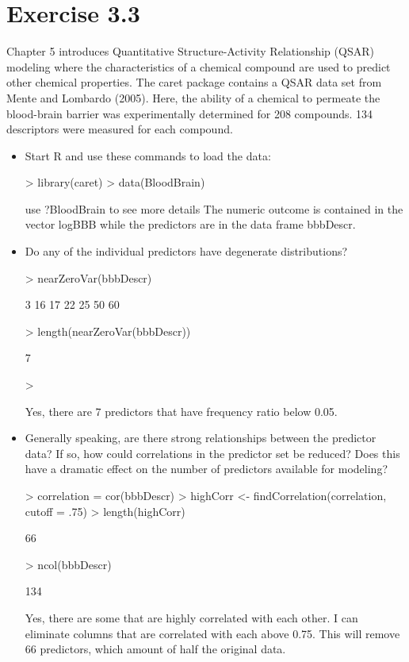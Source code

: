\documentclass[12pt]{article}
\begin{document}
\section{Exercise 3.3}
Chapter 5 introduces Quantitative Structure-Activity Relationship (QSAR) modeling where the characteristics of a chemical compound are used to predict other chemical properties. The caret package contains a QSAR data set from Mente and Lombardo (2005). Here, the ability of a chemical to permeate the blood-brain barrier was experimentally determined for 208 compounds. 134 descriptors were measured for each compound.
\begin{itemize}
\item
Start R and use these commands to load the data:
\begin{Schunk}
\begin{Sinput}
> library(caret)
> data(BloodBrain)
\end{Sinput}
\end{Schunk}
use ?BloodBrain to see more details
The numeric outcome is contained in the vector logBBB while the predictors
are in the data frame bbbDescr.
\item
Do any of the individual predictors have degenerate distributions?
\begin{Schunk}
\begin{Sinput}
> nearZeroVar(bbbDescr)
\end{Sinput}
\begin{Soutput}
[1]  3 16 17 22 25 50 60
\end{Soutput}
\begin{Sinput}
> length(nearZeroVar(bbbDescr))
\end{Sinput}
\begin{Soutput}
[1] 7
\end{Soutput}
\begin{Sinput}
> 
\end{Sinput}
\end{Schunk}
Yes, there are 7 predictors that have frequency ratio below 0.05.

\item
Generally speaking, are there strong relationships between the predictor
data? If so, how could correlations in the predictor set be reduced?
Does this have a dramatic effect on the number of predictors available for
modeling?
\begin{Schunk}
\begin{Sinput}
> correlation = cor(bbbDescr)
> highCorr <- findCorrelation(correlation, cutoff = .75)
> length(highCorr)
\end{Sinput}
\begin{Soutput}
[1] 66
\end{Soutput}
\begin{Sinput}
> ncol(bbbDescr)
\end{Sinput}
\begin{Soutput}
[1] 134
\end{Soutput}
\end{Schunk}
Yes, there are some that are highly correlated with each other. I can eliminate columns that are correlated with each above 0.75. This will remove 66 predictors, which amount of half the original data.
\end{itemize}
\end{document}

